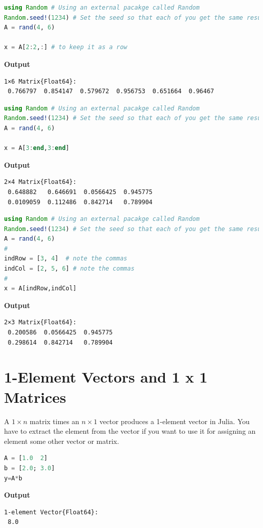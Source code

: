 \begin{lstlisting}[language=Julia,style=mystyle]
using Random # Using an external pacakge called Random 
Random.seed!(1234) # Set the seed so that each of you get the same results. 
A = rand(4, 6)

x = A[2:2,:] # to keep it as a row
\end{lstlisting}
\textbf{Output} 
\begin{verbatim}
1×6 Matrix{Float64}:
 0.766797  0.854147  0.579672  0.956753  0.651664  0.96467
\end{verbatim}

\begin{lstlisting}[language=Julia,style=mystyle]
using Random # Using an external pacakge called Random 
Random.seed!(1234) # Set the seed so that each of you get the same results. 
A = rand(4, 6)

x = A[3:end,3:end]
\end{lstlisting}
\textbf{Output} 
\begin{verbatim}
2×4 Matrix{Float64}:
 0.648882   0.646691  0.0566425  0.945775
 0.0109059  0.112486  0.842714   0.789904
\end{verbatim}

\begin{lstlisting}[language=Julia,style=mystyle]
using Random # Using an external pacakge called Random 
Random.seed!(1234) # Set the seed so that each of you get the same results. 
A = rand(4, 6)
#
indRow = [3, 4]  # note the commas
indCol = [2, 5, 6] # note the commas
#
x = A[indRow,indCol]
\end{lstlisting}
\textbf{Output} 
\begin{verbatim}
2×3 Matrix{Float64}:
 0.200586  0.0566425  0.945775
 0.298614  0.842714   0.789904
\end{verbatim}

\section{1-Element Vectors and 1 x 1 Matrices}
\label{sec:AppendixA:1ElementVectors}

A $ 1 \times n$ matrix times an $ n \times 1$ vector produces a 1-element vector in Julia. You have to extract the element from the vector if you want to use it for assigning an element some other vector or matrix.

\begin{lstlisting}[language=Julia,style=mystyle]
A = [1.0  2]
b = [2.0; 3.0]
y=A*b 
\end{lstlisting}
\textbf{Output} 
\begin{verbatim}
1-element Vector{Float64}:
 8.0
\end{verbatim}

